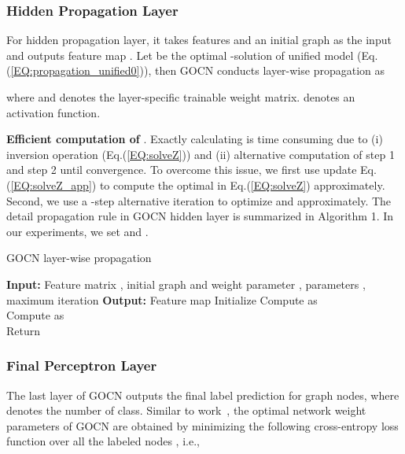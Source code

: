 \documentclass{article}
\begin{document}
\subsubsection{Hidden Propagation Layer}
For hidden propagation layer, it takes features  and an initial graph  as the input and
outputs feature map . Let  be the optimal -solution of unified model  (Eq.(\ref{EQ:propagation_unified0})), then GOCN conducts layer-wise propagation as

where  and  denotes the layer-specific trainable weight matrix.  denotes an activation function. 

 \textbf{Efficient computation of }.
 Exactly calculating  is time consuming due to (i) inversion operation (Eq.(\ref{EQ:solveZ})) and (ii) alternative computation of {step 1} and {step 2} until convergence.
To overcome this issue, we first use  update Eq.(\ref{EQ:solveZ_app}) to compute the optimal  in Eq.(\ref{EQ:solveZ}) approximately.
Second, we use a -step alternative iteration to optimize  and  approximately.
The detail propagation rule in GOCN hidden layer is summarized in Algorithm 1. In our experiments, we set  and .


\begin{algorithm}[h]
\caption{GOCN  layer-wise propagation}
\begin{algorithmic}[1]
\STATE \textbf{Input:} Feature matrix , initial graph  and weight parameter , parameters ,  maximum iteration 
\STATE \textbf{Output:} Feature map 
\STATE Initialize 
\FOR {}
\STATE Compute  as\\

\STATE Compute  as\\

\ENDFOR \label{code:recentEnd}
\STATE Return

\emph{}
\end{algorithmic}
\end{algorithm}




\subsubsection{Final Perceptron Layer}

The last layer of GOCN outputs the final label prediction  for graph nodes, where  denotes the number of class.
Similar to work~\cite{kipf2016semi}, the optimal network weight parameters  of GOCN are obtained by minimizing the following cross-entropy loss function over all the labeled nodes , i.e.,
\end{document}
